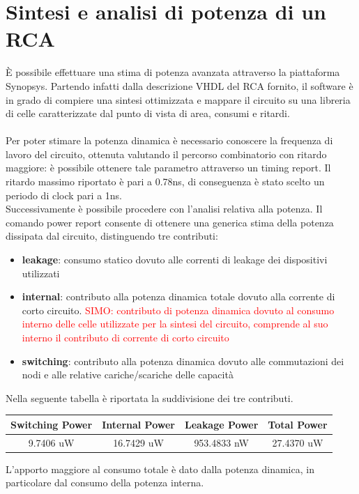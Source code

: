 \documentclass[11pt,  english, makeidx, a4paper, titlepage, oneside]{book}
\begin{document}
\section{Sintesi e analisi di potenza di un RCA}
È possibile effettuare una stima di potenza avanzata attraverso la piattaforma Synopsys. 
Partendo infatti dalla descrizione VHDL del RCA fornito, il software è in grado di compiere una sintesi ottimizzata e mappare il circuito su una libreria di celle caratterizzate dal punto di vista di area, consumi e ritardi.
\\\\
Per poter stimare la potenza dinamica è necessario conoscere la frequenza di lavoro del circuito, ottenuta valutando il percorso combinatorio con ritardo maggiore: è possibile ottenere tale parametro attraverso un timing report.
Il ritardo massimo riportato è pari a 0.78ns, di conseguenza è stato scelto un periodo di clock pari a 1ns.\\
Successivamente è possibile procedere con l'analisi relativa alla potenza.
Il comando power report consente di ottenere una generica stima della potenza dissipata dal circuito, distinguendo tre contributi:
\begin{itemize}
\item \textbf{leakage}: consumo statico dovuto alle correnti di leakage dei dispositivi utilizzati
\item \textbf{internal}: contributo alla potenza dinamica totale dovuto alla corrente di corto circuito.
\textcolor{red}{SIMO: contributo di potenza dinamica dovuto al consumo interno delle celle utilizzate per la sintesi del circuito, comprende al suo interno il contributo di corrente di corto circuito}
\item \textbf{switching}: contributo alla potenza dinamica dovuto alle commutazioni dei nodi e alle relative cariche/scariche delle capacità
\end{itemize}
Nella seguente tabella è riportata la suddivisione dei tre contributi.
\\
\begin{center}
	\begin{tabular}{|c|c|c|c|}
	\hline
	Switching Power & Internal Power & Leakage Power & Total Power \\ 
	\hline
	9.7406 uW & 16.7429 uW & 953.4833 nW & 27.4370 uW \\
	\hline
	\end{tabular}
\end{center}
\vspace{0.3cm}
L'apporto maggiore al consumo totale è dato dalla potenza dinamica, in particolare dal consumo della potenza interna.\\
\end{document}
